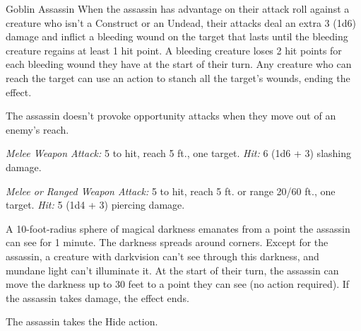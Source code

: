 \documentclass[10pt,a4paper,twoside,bg=print,twocolumn,openany,nodeprecatedcode]{dndbook}
\begin{document}
\begin{DndMonster}[float=t]{Goblin Assassin}
\DndMonsterBasics[
armor-class = {15 (studded leather armor)},
hit-points = {\DndDice{3d6 + 6}},
speed = {30 ft., climb 20 ft.}
]
\DndMonsterAbilityScores[
 str = 8,
 dex = 16,
 con = 14,
 int = 10,
 wis = 10,
 cha = 8
]
\DndMonsterDetails[
skills = {Stealth +7},
senses = {darkvision 60 ft., passive perception 10},
languages = {Common, Goblin},
challenge = 1/2,
]
When the assassin has advantage on their attack roll against a creature who isn't a Construct or an Undead, their attacks deal an extra 3 (1d6) damage and inflict a bleeding wound on the target that lasts until the bleeding creature regains at least 1 hit point. A bleeding creature loses 2 hit points for each bleeding wound they have at the start of their turn. Any creature who can reach the target can use an action to stanch all the target's wounds, ending the effect.

The assassin doesn't provoke opportunity attacks when they move out of an enemy's reach.

\textsl{Melee Weapon Attack:} 5 to hit, reach 5 ft., one target. \textsl{Hit:} 6 (1d6 + 3) slashing damage.

\textsl{Melee or Ranged Weapon Attack:} 5 to hit, reach 5 ft. or range 20/60 ft., one target. \textsl{Hit:} 5 (1d4 + 3) piercing damage.

A 10-foot-radius sphere of magical darkness emanates from a point the assassin can see for 1 minute. The darkness spreads around corners. Except for the assassin, a creature with darkvision can't see through this darkness, and mundane light can't illuminate it. At the start of their turn, the assassin can move the darkness up to 30 feet to a point they can see (no action required). If the assassin takes damage, the effect ends.

The assassin takes the Hide action.

\end{DndMonster}
\end{document}
